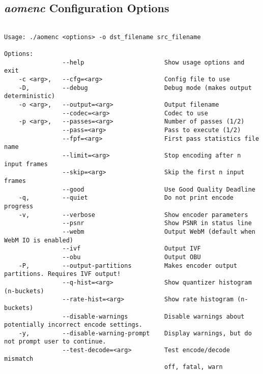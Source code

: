 \begin{appendices}
    \chapter{\emph{aomenc} Configuration Options} \label{app:libaom}
    
\begin{lstlisting}
    
Usage: ./aomenc <options> -o dst_filename src_filename 

Options:
                --help                      Show usage options and exit
    -c <arg>,   --cfg=<arg>                 Config file to use
    -D,         --debug                     Debug mode (makes output deterministic)
    -o <arg>,   --output=<arg>              Output filename
                --codec=<arg>               Codec to use
    -p <arg>,   --passes=<arg>              Number of passes (1/2)
                --pass=<arg>                Pass to execute (1/2)
                --fpf=<arg>                 First pass statistics file name
                --limit=<arg>               Stop encoding after n input frames
                --skip=<arg>                Skip the first n input frames
                --good                      Use Good Quality Deadline
    -q,         --quiet                     Do not print encode progress
    -v,         --verbose                   Show encoder parameters
                --psnr                      Show PSNR in status line
                --webm                      Output WebM (default when WebM IO is enabled)
                --ivf                       Output IVF
                --obu                       Output OBU
    -P,         --output-partitions         Makes encoder output partitions. Requires IVF output!
                --q-hist=<arg>              Show quantizer histogram (n-buckets)
                --rate-hist=<arg>           Show rate histogram (n-buckets)
                --disable-warnings          Disable warnings about potentially incorrect encode settings.
    -y,         --disable-warning-prompt    Display warnings, but do not prompt user to continue.
                --test-decode=<arg>         Test encode/decode mismatch
                                            off, fatal, warn


\end{lstlisting}
\end{appendices}
